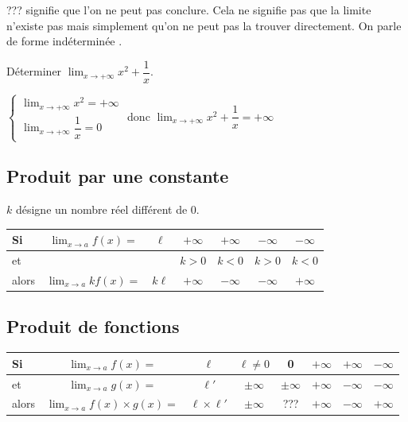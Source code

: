 \documentclass[french]{book}
\newcommand{\ds}{\displaystyle}
\newcommand{\limite}[2][x]{\ds\lim_{#1\rightarrow #2}}
\newcommand{\limpinf}[1][x]{\ds\lim_{#1\rightarrow +\infty}}
\begin{document}
\begin{rem}
??? signifie que l'on ne peut pas conclure. Cela ne signifie pas que la limite n'existe pas mais simplement qu'on ne peut pas la trouver directement. On parle de \og forme ind\'etermin\'ee \fg.
\end{rem}

\begin{exemple}
D\'eterminer $\limpinf x^{2}+\dfrac{1}{x}$.
\end{exemple}


$\left\lbrace
\begin{array}{l}
\limpinf x^{2}=+\infty \\
\limpinf \dfrac{1}{x}=0
\end{array}
\right.$
donc $\limpinf x^{2}+\dfrac{1}{x}=+\infty$


\subsection{Produit par une constante}
$k$ d\'esigne un nombre r\'eel diff\'erent de 0.
\begin{center}
\renewcommand{\arraystretch}{2}
\begin{tabular}{|lc|c|c|c|c|c|} \hline
Si & $\limite[x]{a}f(x)=$ & $\ell$ & $+\infty$ & $+\infty$ & $-\infty$ & $-\infty$ \\ \hline
et &  &  & $k>0$ & $k<0$ & $k>0$ & $k<0$ \\ \hline
alors & $\limite[x]{a}kf(x)=$ & $k\ell$ & $+\infty$ & $-\infty$ & $-\infty$ & $+\infty$ \\ \hline
\end{tabular}
\end{center}

\subsection{Produit de fonctions}
\begin{center}
\renewcommand{\arraystretch}{2}
\begin{tabular}{|lc|c|c|c|c|c|c|} \hline
Si & $\limite[x]{a}f(x)=$ & $\ell$ & $\ell\neq0$ & 0 & $+\infty$ & $+\infty$ & $-\infty$ \\ \hline
et & $\limite[x]{a}g(x)=$ & $\ell'$ & $\pm\infty$ & $\pm\infty$ & $+\infty$ & $-\infty$ & $-\infty$ \\ \hline
alors & $\limite[x]{a}f(x)\times g(x)=$ & $\ell\times \ell'$ & $\pm\infty$ & ??? & $+\infty$ & $-\infty$ & $+\infty$ \\ \hline
\end{tabular}
\end{center}
\end{document}
